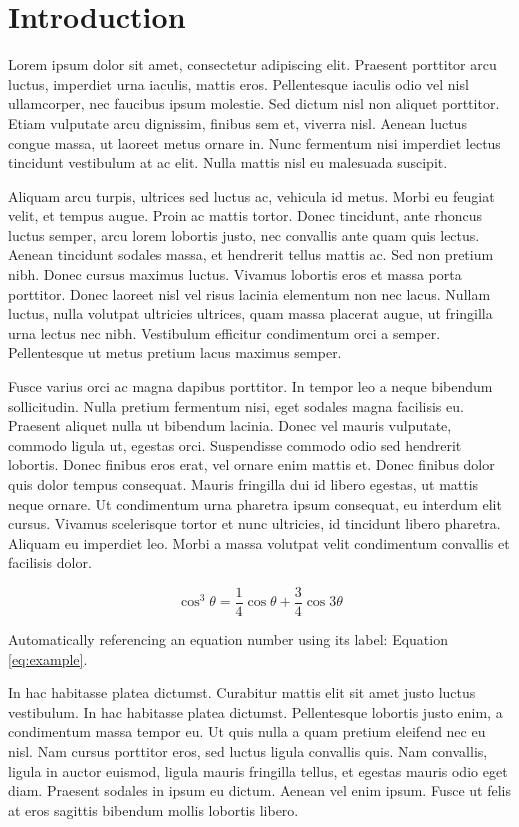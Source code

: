 \documentclass[a4paper]{LTJournalArticle}
\begin{document}
	\section{Introduction}
	
	Lorem ipsum dolor sit amet, consectetur adipiscing elit. Praesent porttitor arcu luctus, imperdiet urna iaculis, mattis eros. Pellentesque iaculis odio vel nisl ullamcorper, nec faucibus ipsum molestie. Sed dictum nisl non aliquet porttitor. Etiam vulputate arcu dignissim, finibus sem et, viverra nisl. Aenean luctus congue massa, ut laoreet metus ornare in. Nunc fermentum nisi imperdiet lectus tincidunt vestibulum at ac elit. Nulla mattis nisl eu malesuada suscipit.
	
	Aliquam arcu turpis, ultrices sed luctus ac, vehicula id metus. Morbi eu feugiat velit, et tempus augue. Proin ac mattis tortor. Donec tincidunt, ante rhoncus luctus semper, arcu lorem lobortis justo, nec convallis ante quam quis lectus. Aenean tincidunt sodales massa, et hendrerit tellus mattis ac. Sed non pretium nibh. Donec cursus maximus luctus. Vivamus lobortis eros et massa porta porttitor. Donec laoreet nisl vel risus lacinia elementum non nec lacus. Nullam luctus, nulla volutpat ultricies ultrices, quam massa placerat augue, ut fringilla urna lectus nec nibh. Vestibulum efficitur condimentum orci a semper. Pellentesque ut metus pretium lacus maximus semper.
	
	Fusce varius orci ac magna dapibus porttitor. In tempor leo a neque bibendum sollicitudin. Nulla pretium fermentum nisi, eget sodales magna facilisis eu. Praesent aliquet nulla ut bibendum lacinia. Donec vel mauris vulputate, commodo ligula ut, egestas orci. Suspendisse commodo odio sed hendrerit lobortis. Donec finibus eros erat, vel ornare enim mattis et. Donec finibus dolor quis dolor tempus consequat. Mauris fringilla dui id libero egestas, ut mattis neque ornare. Ut condimentum urna pharetra ipsum consequat, eu interdum elit cursus. Vivamus scelerisque tortor et nunc ultricies, id tincidunt libero pharetra. Aliquam eu imperdiet leo. Morbi a massa volutpat velit condimentum convallis et facilisis dolor.
	
	\begin{equation}
		\cos^3 \theta =\frac{1}{4}\cos\theta+\frac{3}{4}\cos 3\theta
		\label{eq:example}
	\end{equation}
	
	Automatically referencing an equation number using its label: Equation \ref{eq:example}.
	
	In hac habitasse platea dictumst. Curabitur mattis elit sit amet justo luctus vestibulum. In hac habitasse platea dictumst. Pellentesque lobortis justo enim, a condimentum massa tempor eu. Ut quis nulla a quam pretium eleifend nec eu nisl. Nam cursus porttitor eros, sed luctus ligula convallis quis. Nam convallis, ligula in auctor euismod, ligula mauris fringilla tellus, et egestas mauris odio eget diam. Praesent sodales in ipsum eu dictum. Aenean vel enim ipsum. Fusce ut felis at eros sagittis bibendum mollis lobortis libero.
	
\end{document}

